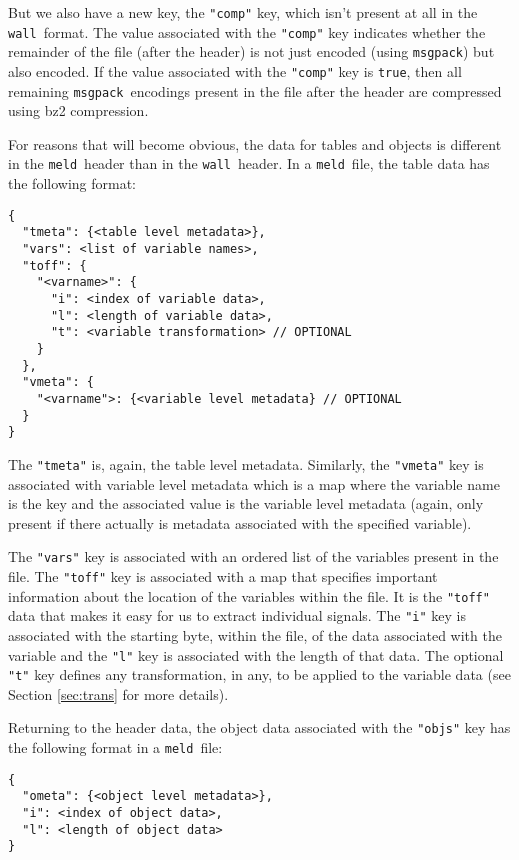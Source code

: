 \documentclass[11pt,a4paper,onecolumn]{article}
\newcommand{\wall}{\texttt{wall}}
\newcommand{\meld}{\texttt{meld}}
\newcommand{\msgpack}{\texttt{msgpack}}
\newcommand{\code}[1]{\texttt{#1}} %
\begin{document}
But we also have a new key, the \code{"comp"} key, which isn't present
at all in the \wall\ format.  The value associated with the
\code{"comp"} key indicates whether the remainder of the file (after
the header) is not just encoded (using \msgpack) but also encoded.  If
the value associated with the \code{"comp"} key is \code{true}, then
all remaining \msgpack\ encodings present in the file after the header
are compressed using bz2\cite{BZ2} compression.

For reasons that will become obvious, the data for tables and objects
is different in the \meld\ header than in the \wall\ header.  In a
\meld\ file, the table data has the following format:

\begin{verbatim}
{
  "tmeta": {<table level metadata>},
  "vars": <list of variable names>,
  "toff": {
    "<varname>": {
      "i": <index of variable data>,
      "l": <length of variable data>,
      "t": <variable transformation> // OPTIONAL
    }
  },
  "vmeta": {
    "<varname">: {<variable level metadata} // OPTIONAL
  }
}
\end{verbatim}

The \code{"tmeta"} is, again, the table level metadata.  Similarly,
the \code{"vmeta"} key is associated with variable level metadata
which is a map where the variable name is the key and the associated
value is the variable level metadata (again, only present if there
actually is metadata associated with the specified variable).

The \code{"vars"} key is associated with an ordered list of the
variables present in the file.  The \code{"toff"} key is associated
with a map that specifies important information about the location of
the variables within the file.  It is the \code{"toff"} data that
makes it easy for us to extract individual signals.  The \code{"i"}
key is associated with the starting byte, within the file, of the data
associated with the variable and the \code{"l"} key is associated with
the length of that data.  The optional \code{"t"} key defines any
transformation, in any, to be applied to the variable data (see
Section \ref{sec:trans} for more details).

Returning to the header data, the object data associated with the
\code{"objs"} key has the following format in a \meld\ file:

\begin{verbatim}
{
  "ometa": {<object level metadata>},
  "i": <index of object data>,
  "l": <length of object data>
}
\end{verbatim}
\end{document}
